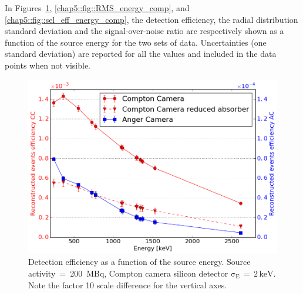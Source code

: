 In Figures~\ref{chap5::fig::eff_energy_comp}, \ref{chap5::fig::RMS_energy_comp}, and \ref{chap5::fig::sel_eff_energy_comp}, the detection efficiency, the radial distribution standard deviation and the signal-over-noise ratio are respectively shown as a function of the source energy for the two sets of data. Uncertainties (one standard deviation) are reported for all the values and included in the data points when not visible.


\begin{figure}[h!]
\begin{center}
\hspace{0.4cm} \includegraphics[scale=0.4]{03_GraphicFiles/chapter5_SPECTsimu/SPECT/comparison/reduced_absorber/effVSenergy_overlap}
\caption{Detection efficiency as a function of the source energy. Source activity~=~200~MBq, Compton camera silicon detector $\mathrm{\sigma_{E}\,=\,2\,keV}$. Note the factor 10 scale difference for the vertical axes.}
\label{chap5::fig::eff_energy_comp}
\end{center}
\end{figure}

